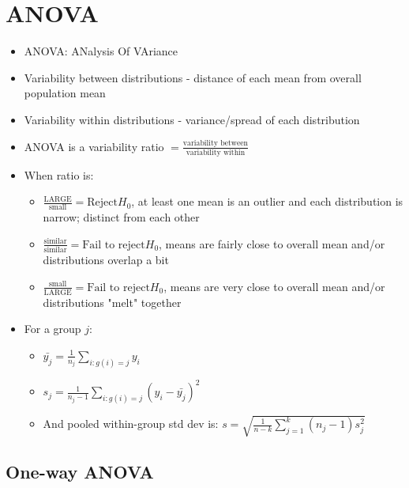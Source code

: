 \documentclass{article}
\begin{document}
\section{ANOVA}

\begin{itemize}
    \item ANOVA: ANalysis Of VAriance
    \item Variability between distributions - distance of each mean from overall population mean
    \item Variability within distributions - variance/spread of each distribution
    \item ANOVA is a variability ratio $= \frac{\text{variability between}}{\text{variability within}}$
    \item When ratio is:
    \begin{itemize}
        \item $\frac{\text{LARGE}}{\text{small}}=\text{Reject} H_0$, at least one mean is an outlier and each distribution is narrow; distinct from each other
        \item $\frac{\text{similar}}{\text{similar}}=\text{Fail to reject} H_0$, means are fairly close to overall mean and/or distributions overlap a bit
        \item $\frac{\text{small}}{\text{LARGE}}=\text{Fail to reject} H_0$, means are very close to overall mean and/or distributions "melt" together
    \end{itemize}
    \item For a group $j$:
    \begin{itemize}
        \item $\bar{y_j}=\frac{1}{n_j} \sum_{i:g(i)=j} y_i$
        \item $s_j=\frac{1}{n_j-1} \sum_{i:g(i)=j} (y_i - \bar{y_j})^2$
        \item And pooled within-group std dev is: $s=\sqrt{\frac{1}{n-k} \sum_{j=1}^k (n_j-1)s_j^2}$
    \end{itemize}
\end{itemize}

\subsection{One-way ANOVA}
\end{document}
